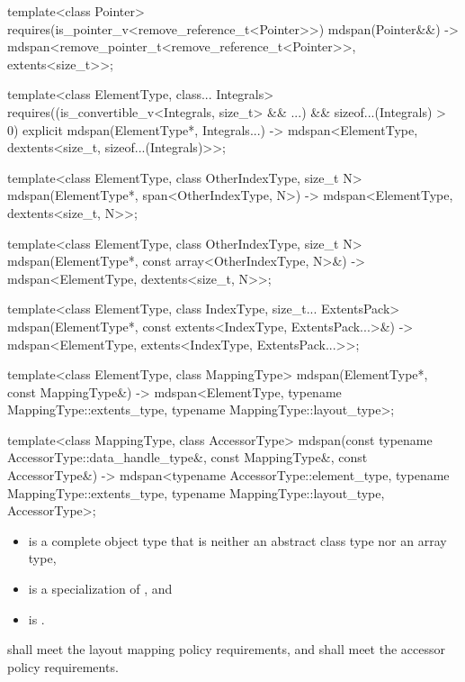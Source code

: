 \begin{codeblock}
{  template<class Pointer>
    requires(is_pointer_v<remove_reference_t<Pointer>>)
    mdspan(Pointer&&)
      -> mdspan<remove_pointer_t<remove_reference_t<Pointer>>, extents<size_t>>;

  template<class ElementType, class... Integrals>
    requires((is_convertible_v<Integrals, size_t> && ...) && sizeof...(Integrals) > 0)
    explicit mdspan(ElementType*, Integrals...)
      -> mdspan<ElementType, dextents<size_t, sizeof...(Integrals)>>;

  template<class ElementType, class OtherIndexType, size_t N>
    mdspan(ElementType*, span<OtherIndexType, N>)
      -> mdspan<ElementType, dextents<size_t, N>>;

  template<class ElementType, class OtherIndexType, size_t N>
    mdspan(ElementType*, const array<OtherIndexType, N>&)
      -> mdspan<ElementType, dextents<size_t, N>>;

  template<class ElementType, class IndexType, size_t... ExtentsPack>
    mdspan(ElementType*, const extents<IndexType, ExtentsPack...>&)
      -> mdspan<ElementType, extents<IndexType, ExtentsPack...>>;

  template<class ElementType, class MappingType>
    mdspan(ElementType*, const MappingType&)
      -> mdspan<ElementType, typename MappingType::extents_type,
                typename MappingType::layout_type>;

  template<class MappingType, class AccessorType>
    mdspan(const typename AccessorType::data_handle_type&, const MappingType&,
           const AccessorType&)
      -> mdspan<typename AccessorType::element_type, typename MappingType::extents_type,
                typename MappingType::layout_type, AccessorType>;
}
\end{codeblock}

\pnum
\mandates
\begin{itemize}
\item
{} is a complete object type
that is neither an abstract class type nor an array type,
\item
{} is a specialization of , and
\item
{}
is .
\end{itemize}

\pnum
{} shall meet
the layout mapping policy requirements, and
 shall meet
the accessor policy requirements.

